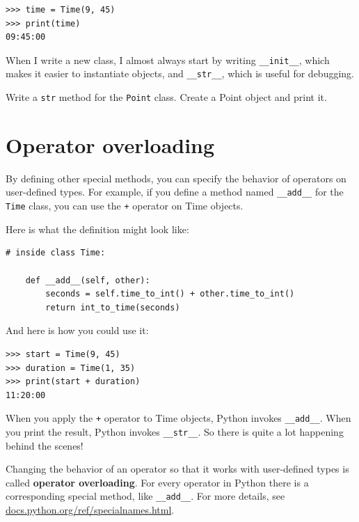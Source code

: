 \documentclass[10pt]{book}
\begin{document}

\beforeverb
\begin{verbatim}
>>> time = Time(9, 45)
>>> print(time)
09:45:00
\end{verbatim}
\afterverb
%
When I write a new class, I almost always start by writing 
\verb"__init__", which makes it easier to instantiate objects, and 
\verb"__str__", which is useful for debugging.


\begin{ex}
Write a {\tt str} method for the {\tt Point} class.  Create
a Point object and print it.
\end{ex}


\section{Operator overloading}
\label{operator overloading}

By defining other special methods, you can specify the behavior
of operators on user-defined types.  For example, if you define
a method named \verb"__add__" for the {\tt Time} class, you can use the
{\tt +} operator on Time objects.

Here is what the definition might look like:


\beforeverb
\begin{verbatim}
# inside class Time:

    def __add__(self, other):
        seconds = self.time_to_int() + other.time_to_int()
        return int_to_time(seconds)
\end{verbatim}
\afterverb
%
And here is how you could use it:

\beforeverb
\begin{verbatim}
>>> start = Time(9, 45)
>>> duration = Time(1, 35)
>>> print(start + duration)
11:20:00
\end{verbatim}
\afterverb
%
When you apply the {\tt +} operator to Time objects, Python invokes
\verb"__add__".  When you print the result, Python invokes 
\verb"__str__".  So there is quite a lot happening behind the scenes!


Changing the behavior of an operator so that it works with
user-defined types is called {\bf operator overloading}.  For every
operator in Python there is a corresponding special method, like 
\verb"__add__".  For more details, see
\url{docs.python.org/ref/specialnames.html}.
\end{document}
